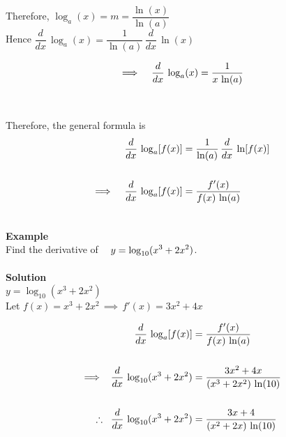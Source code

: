 \documentclass[11pt,a4paper]{article}
\begin{document}
Therefore,\hspace{0.3cm} $\displaystyle{\log_a(x)= m = \dfrac{\ln (x)}{\ln (a)}}$\\

Hence\hspace{0.3cm} $\displaystyle{\dfrac{d}{dx}\, \log_a(x) = \dfrac{1}{\ln (a)}\,\dfrac{d}{dx}\, \ln (x)}$

$$\implies\hspace{0.3cm}\dfrac{d}{dx}\, \log_a(x) = \dfrac{1}{x\, \ln (a)}$$\\\\



Therefore, the general formula is
\begin{align*}
\dfrac{d}{dx}\, \log_a[f(x)] & = \dfrac{1}{\ln (a)}\, \dfrac{d}{dx}\, \ln [f(x)]\\\\
\implies\hspace{0.3cm}\dfrac{d}{dx}\, \log_a[f(x)] & = \dfrac{f'(x)}{f(x)\, \ln (a)}\\\\
\end{align*}






\textbf{Example}\\
Find the derivative of $\hspace{0.3cm}\displaystyle{y = \log_{10}(x^3 + 2x^2)}$.\\\\



\textbf{Solution}\\

$y = \log_{10}(x^3 + 2x^2)$\\

Let \hspace{0.2cm} $f(x) = x^3 + 2x^2\, \implies\, f'(x) = 3x^2 + 4x$

\begin{align*}
\dfrac{d}{dx}\, \log_a [f(x)] & = \dfrac{f'(x)}{f(x) \, \ln (a)}\\\\
\implies\hspace{0.2cm} \dfrac{d}{dx}\, \log_{10}(x^3 + 2x^2) &  = \dfrac{3x^2 + 4x}{(x^3 + 2x^2)\, \ln (10)}\\\\
\therefore\hspace{0.2cm} \dfrac{d}{dx}\, \log_{10}(x^3 + 2x^2) & = \dfrac{3x + 4}{(x^2 + 2x)\, \ln (10)}\\\\
\end{align*}
\end{document}
